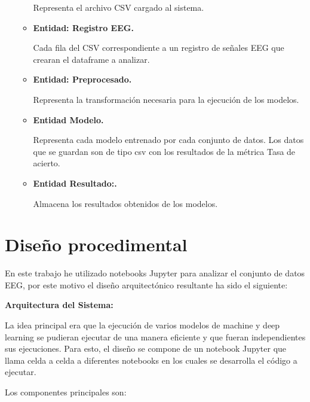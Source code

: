 \begin{enumerate}
\begin{itemize}
    Representa el archivo CSV cargado al sistema.
    
    \item
    \textbf{Entidad: Registro EEG.}
    
    Cada fila del CSV correspondiente a un registro de señales EEG que crearan el dataframe a analizar. 
    
    
    
    \item
    \textbf{Entidad: Preprocesado.}
    
    Representa la transformación necesaria para la ejecución de los modelos. 
    
 
    \item
    \textbf{Entidad Modelo.}
    
    Representa cada modelo entrenado por cada conjunto de datos. Los datos que se guardan son de tipo csv con los resultados de la métrica Tasa de acierto.
    
    
    \item
    \textbf{Entidad Resultado:.}
    
    Almacena los resultados obtenidos de los modelos.  
       
\end{itemize}
\end{enumerate}






\section{Diseño procedimental}

En este trabajo he utilizado notebooks Jupyter para analizar el conjunto de datos EEG, por este motivo el diseño arquitectónico resultante ha sido el siguiente:


\textbf{Arquitectura del Sistema:}

La idea principal era que la ejecución de varios modelos de machine y deep learning se pudieran ejecutar de una manera eficiente y que fueran independientes sus ejecuciones. 
Para esto, el diseño se compone de un notebook Jupyter que llama celda a celda a diferentes notebooks en los cuales se desarrolla el código a ejecutar. 

Los componentes principales son:


